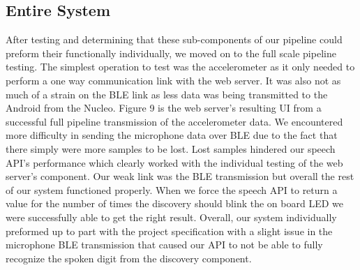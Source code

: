 \subsection{Entire System}
After testing and determining that these sub-components of our pipeline could preform their functionally individually, we moved on to the full scale pipeline testing. The simplest operation to test was the accelerometer as it only needed to perform a one way communication link with the web server. It was also not as much of a strain on the BLE link as less data was being transmitted to the Android from the Nucleo. Figure 9 is the web server's resulting UI from a successful full pipeline transmission of the accelerometer data. We encountered more difficulty in sending the microphone data over BLE due to the fact that there simply were more samples to be lost. Lost samples hindered our speech API's performance which clearly worked with the individual testing of the web server's component. Our weak link was the BLE transmission but overall the rest of our system functioned properly. When we force the speech API to return a value for the number of times the discovery should blink the on board LED we were successfully able to get the right result. Overall, our system individually preformed up to part with the project specification with a slight issue in the microphone BLE transmission that caused our API to not be able to fully recognize the spoken digit from the discovery component.

